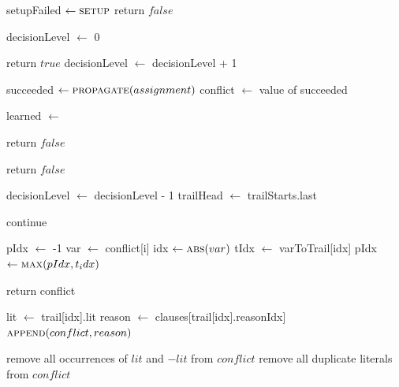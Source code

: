 \begin{algorithm}[H]
\caption{Initial CDCL}\label{alg:30}
\begin{algorithmic}[1]
    \State setupFailed $\gets \Call{setup}{}$
        return $false$
    \EndIf

    \State decisionLevel $\gets$ 0

            \State return $true$
        \Else 
            \State decisionLevel $\gets$ decisionLevel + 1
        \EndIf

        \State succeeded $\gets \Call{propagate}{assignment}$
            \State conflict $\gets$ value of succeeded

            \State learned $\gets$ 

                \State return $false$
            \EndIf

            \State {}

                \State return $false$
            \EndIf

            \State decisionLevel $\gets$ decisionLevel - 1
            \State trailHead $\gets$ trailStarts.last

            \State continue
        \EndIf
    \EndWhile
\EndProcedure
\end{algorithmic}
\end{algorithm}

\begin{algorithm}[H]
\caption{Resolve Conflict}\label{alg:31}
\begin{algorithmic}[1]
        \State pIdx $\gets$ -1
            \State var $\gets$ conflict[i]
            \State idx $\gets \Call{abs}{var}$
            \State tIdx $\gets$ varToTrail[idx]
                \State pIdx $\gets \Call{max}{pIdx, t_idx}$
            \EndIf
        \EndFor

            \State return conflict
        \EndIf

        \State lit $\gets$ trail[idx].lit
        \State reason $\gets$ clauses[trail[idx].reasonIdx]
        \State $\Call{append}{conflict, reason}$

        \State remove all occurrences of $lit$ and $-lit$ from $conflict$
        \State remove all duplicate literals from $conflict$
    \EndWhile
\EndProcedure
\end{algorithmic}
\end{algorithm}

